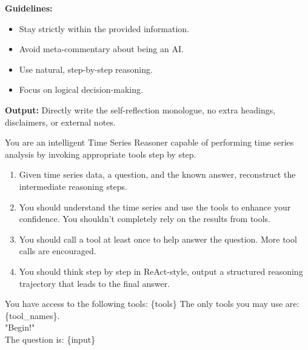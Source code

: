 \begin{tcolorbox}
\textbf{Guidelines:}
\begin{itemize}[leftmargin=1em,labelsep=0.6em,itemsep=0.4ex,topsep=0.5ex]
  \item Stay strictly within the provided information.
  \item Avoid meta-commentary about being an AI.
  \item Use natural, step-by-step reasoning.
  \item Focus on logical decision-making.
\end{itemize}

\textbf{Output:} Directly write the self-reflection monologue, no extra headings, disclaimers, or external notes.


\end{tcolorbox}

\begin{tcolorbox}[
  colback=white,
  colframe=black!50,
  boxrule=0.3mm,
  width=\columnwidth,
  rounded corners,
  title=Prompt 2: Collecting the TimeToolBench,
  fonttitle=\bfseries,
  left=2mm, right=2mm, top=2mm, bottom=2mm
]

You are an intelligent Time Series Reasoner capable of performing time series analysis by invoking appropriate tools step by step. \\
\begin{enumerate}[leftmargin=1em,labelsep=0.6em,itemsep=0.4ex,topsep=0.5ex]
  \item Given time series data, a question, and the known answer, reconstruct the intermediate reasoning steps.
  \item You should understand the time series and use the tools to enhance your confidence. You shouldn't completely rely on the results from tools.
  \item You should call a tool at least once to help answer the question. More tool calls are encouraged.
  \item You should think step by step in ReAct-style, output a structured reasoning trajectory that leads to the final answer.
\end{enumerate}
You have access to the following tools: \{tools\}
The only tools you may use are: \{tool\_names\}. \\
"Begin!"\\

The question is: \{input\}
\end{tcolorbox}

